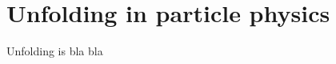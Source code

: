 %
%
%

\chapter{Unfolding in particle physics}\label{chap:unfolding}
\enlargethispage{2ex}
\vspace*{-2pt}

\enlargethispage{2ex}

Unfolding is bla bla

%
